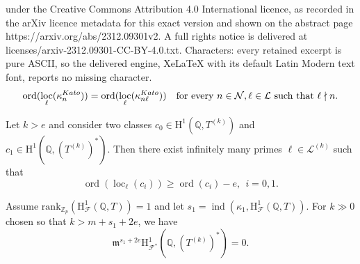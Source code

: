 \documentclass[10pt,a4paper]{amsart}
\DeclareMathOperator{\loc}{loc}
\DeclareMathOperator{\ord}{ord}
\newcommand{\Fcal}{\mathcal{F}}
\newcommand{\Q}{\mathbb{Q}}
\newcommand{\Z}{\mathbb{Z}}
\newcommand{\cL}{\mathcal{L}}
\newcommand{\cN}{\mathcal{N}}
\newcommand{\fm}{\mathfrak{m}}
\newcommand{\ind}{\operatorname{ind}}
\newcommand{\rH}{\mathrm{H}}
\newcommand{\rank}{\mathrm{rank}}
\begin{document}
under the Creative Commons Attribution 4.0 International licence, as recorded in the arXiv licence metadata for this exact version and shown on the abstract page https://arxiv.org/abs/2312.09301v2. A full rights notice is delivered at licenses/arxiv-2312.09301-CC-BY-4.0.txt. Characters: every retained excerpt is pure ASCII, so the delivered engine, XeLaTeX with its default Latin Modern text font, reports no missing character.
\begin{equation}\label{eq:finsingkato}
\ord(\loc_\ell(\kappa_n^{\rm Kato}))=\ord(\loc_\ell(\kappa^{\rm Kato}_{n\ell})) \ \ \text{ for every $n\in \cN, \ell\in\cL$ such that $\ell\nmid n$}.
\end{equation} 

\begin{prop}\label{prop:prime2} 
Let $k>e$ and consider two classes $c_0\in \rH^1(\Q,T^{(k)})$ and $c_1\in \rH^1(\Q,(T^{(k)})^*)$. 
Then there exist infinitely many primes $\ell\in \cL^{(k)}$ such that 
$$
\ord(\loc_\ell(c_i)) \geqslant \ord(c_i) - e, \ \ i=0,1.
$$
\end{prop}

\begin{prop}\label{prop:expbound}
Assume $\rank_{\Z_p}(\rH^1_{\Fcal}(\Q,T))=1$ and let $s_1=\ind(\kappa_1, \rH^1_{\Fcal}(\Q,T))$. For $k\gg 0$ chosen so that $k > m+s_1+2e$, we have $$\fm^{s_1+2e}\rH^1_{\Fcal^*}(\Q,(T^{(k)})^*)=0.$$
\end{prop}
\end{document}
